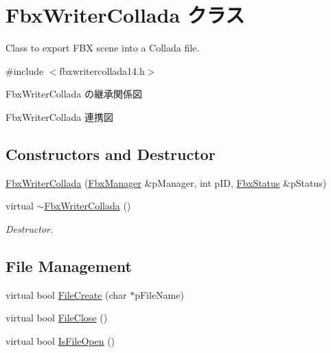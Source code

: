 \hypertarget{class_fbx_writer_collada}{}\section{Fbx\+Writer\+Collada クラス}
\label{class_fbx_writer_collada}


Class to export F\+BX scene into a Collada file.  




{\ttfamily \#include $<$fbxwritercollada14.\+h$>$}



Fbx\+Writer\+Collada の継承関係図


Fbx\+Writer\+Collada 連携図
\subsection*{Constructors and Destructor}
\begin{DoxyCompactItemize}
\item 
\hyperlink{class_fbx_writer_collada_aed549791a8dec6dbeba7a6293c098cdb}{Fbx\+Writer\+Collada} (\hyperlink{class_fbx_manager}{Fbx\+Manager} \&p\+Manager, int p\+ID, \hyperlink{class_fbx_status}{Fbx\+Status} \&p\+Status)
\item 
virtual \hyperlink{class_fbx_writer_collada_a115ea7677c58adb2761c2d7e5c17ac6d}{$\sim$\+Fbx\+Writer\+Collada} ()
\begin{DoxyCompactList}\small\item\em Destructor. \end{DoxyCompactList}\end{DoxyCompactItemize}
\subsection*{File Management}
\begin{DoxyCompactItemize}
\item 
virtual bool \hyperlink{class_fbx_writer_collada_a973e285681d8486e74a200812eeee70a}{File\+Create} (char $\ast$p\+File\+Name)
\item 
virtual bool \hyperlink{class_fbx_writer_collada_ae33b59a7bdbd04cca55a4632c7204f5e}{File\+Close} ()
\item 
virtual bool \hyperlink{class_fbx_writer_collada_a77c117aa61d57faf57e6810823938cbd}{Is\+File\+Open} ()
\end{DoxyCompactItemize}
